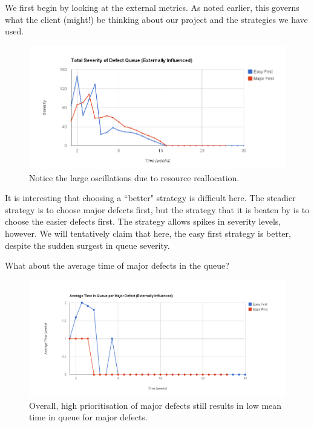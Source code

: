 We first begin by looking at the external metrics.
As noted earlier, this governs what the client (might!) be thinking about our project and the strategies we have used.

\begin{figure}[ht!]
	\centering
	\includegraphics[scale=0.5]{graphs/QueueImpact_ex.png}
	\caption{Notice the large oscillations due to resource reallocation.} 
	\label{ex_qimpact}
\end{figure}

It is interesting that choosing a ``better" strategy is difficult here.
The steadier strategy is to choose major defects first, but the strategy that it is beaten by is to
choose the easier defects first.
The strategy allows spikes in severity levels, however.
We will tentatively claim that here, the easy first strategy is better, despite the sudden surgest
in queue severity.

\pagebreak

What about the average time of major defects in the queue?

\begin{figure}[ht!]
	\centering
	\includegraphics[angle=90,scale=0.4]{graphs/avgMajorQueueTime_ex.png}
	\caption{Overall, high prioritisation of major defects still results in low mean time in queue for
major defects.} 
	\label{ex_avgmajqtime}
\end{figure}

